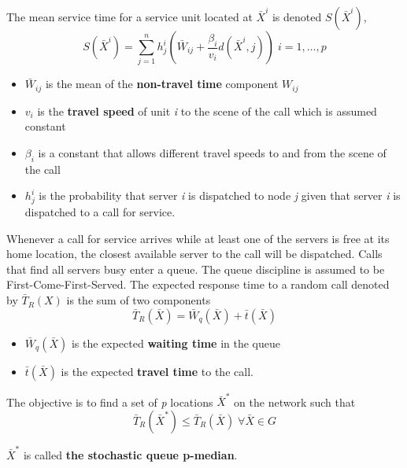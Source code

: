 \begin{frame}
The mean service time for a service unit located at $\bar{X}^i$ is denoted $S(\bar{X}^i)$,
\begin{equation}
  S(\bar{X}^i) = \sum_{j = 1}^{n}{h_j^i\left(\bar{W}_{ij}+\frac{{\beta}_i}{v_i}d(\bar{X}^i,j)\right)} \; i=1,\ldots,p
\end{equation}
\begin{itemize}
\item $\bar{W}_{ij}$ is the mean of the \textbf{non-travel time} component $W_{ij}$
\item $v_i$ is the \textbf{travel speed} of unit \textit{i} to the scene of the call which is assumed constant
\item $\beta_i$ is a constant that allows different travel speeds to and from the scene of the call
\item $h_j^i$ is the probability that server \textit{i} is dispatched to node \textit{j} given that server \textit{i} is dispatched to a call for service.
\end{itemize}
\end{frame}

\begin{frame}
Whenever a call for service arrives while at least one of the servers is free at its home location,
the closest available server to the call will be dispatched.
Calls that find all servers busy enter a queue.
The queue discipline is assumed to be First-Come-First-Served.
The expected response time to a random call denoted by $\bar{T}_R(X)$ is the sum of two components
\begin{equation*}
  \bar{T}_R(\bar{X}) = \bar{W}_q(\bar{X})+\bar{t}(\bar{X})
\end{equation*}

\begin{itemize}
\item $\bar{W}_q(\bar{X})$ is the expected \textbf{waiting time} in the queue
\item $\bar{t}(\bar{X})$ is the expected \textbf{travel time} to the call.
\end{itemize}

The objective is to find a set of \textit{p} locations $\bar{X}^*$ on the network such that
\begin{equation*}
  \bar{T}_R(\bar{X}^*) \leq \bar{T}_R(\bar{X}) \; \forall \bar{X} \in G
\end{equation*}

$\bar{X}^*$ is called \textbf{the stochastic queue p-median}.
\end{frame}

